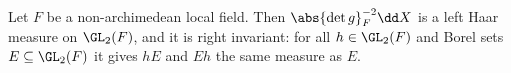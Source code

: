 Let $F$ be a non-archimedean local field. Then $\abs{\det g}_F^{-2}\dd X$ is a left Haar measure on $\GL_2(F)$, and it is
right invariant: for all $h\in\GL_2(F)$ and Borel sets $E\subseteq\GL_2(F)$ it gives $hE$ and $Eh$ the same measure as $E$.

